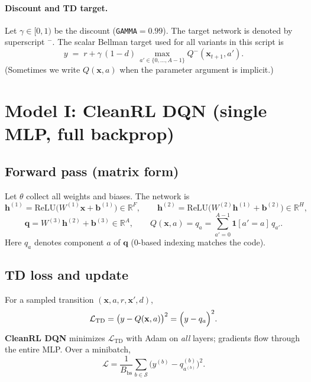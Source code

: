 \documentclass[11pt]{article}
\begin{document}
\paragraph{Discount and TD target.}
Let $\gamma \in [0,1)$ be the discount (\texttt{GAMMA}${}=0.99$). The target network is denoted by superscript ${}^{-}$. The scalar Bellman target used for all variants in this script is
\begin{equation}
\label{eq:y}
y \;=\; r + \gamma\,(1-d)\,\max_{a' \in \{0,\ldots,A-1\}} Q^{-}(\mathbf{x}_{t+1}, a').
\end{equation}
(Sometimes we write $Q(\mathbf{x},a)$ when the parameter argument is implicit.)

\section{Model I: CleanRL DQN (single MLP, full backprop)}
\label{sec:dqn}

\subsection{Forward pass (matrix form)}
Let $\theta$ collect all weights and biases. The network is
\begin{equation}
\mathbf{h}^{(1)} = \mathrm{ReLU}\!\bigl(W^{(1)}\mathbf{x} + \mathbf{b}^{(1)}\bigr) \in \mathbb{R}^{F},
\qquad
\mathbf{h}^{(2)} = \mathrm{ReLU}\!\bigl(W^{(2)}\mathbf{h}^{(1)} + \mathbf{b}^{(2)}\bigr) \in \mathbb{R}^{H},
\end{equation}
\begin{equation}
\mathbf{q} = W^{(3)}\mathbf{h}^{(2)} + \mathbf{b}^{(3)} \in \mathbb{R}^{A},
\qquad
Q(\mathbf{x},a) = q_a = \sum_{a'=0}^{A-1} \mathbf{1}[a'=a]\, q_{a'}.
\end{equation}
Here $q_a$ denotes component $a$ of $\mathbf{q}$ (0-based indexing matches the code).

\subsection{TD loss and update}
For a sampled transition $(\mathbf{x},a,r,\mathbf{x}',d)$,
\begin{equation}
\mathcal{L}_{\mathrm{TD}} = \bigl( y - Q(\mathbf{x},a) \bigr)^2
= \Bigl( y - q_a \Bigr)^2.
\end{equation}
\textbf{CleanRL DQN} minimizes $\mathcal{L}_{\mathrm{TD}}$ with Adam on \emph{all} layers; gradients flow through the entire MLP. Over a minibatch,
\begin{equation}
\mathcal{L} = \frac{1}{B_{\mathrm{bs}}} \sum_{b \in \mathcal{S}} \bigl( y^{(b)} - q^{(b)}_{a^{(b)}} \bigr)^2.
\end{equation}
\end{document}
